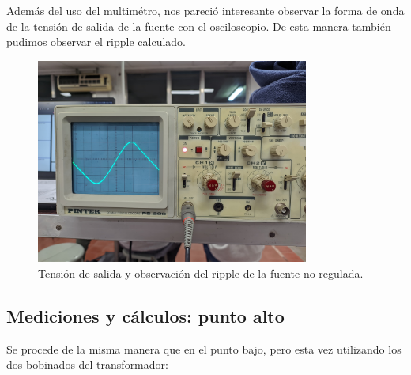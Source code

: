 \documentclass[chaptersright]{informeutn}
\begin{document}
        Además del uso del multimétro, nos pareció interesante observar la forma de onda de la tensión de salida de la
        fuente con el osciloscopio. De esta manera también pudimos observar el ripple calculado.
        \begin{figure}[h!]
          \centering
          \includegraphics[width=0.8\textwidth]{pictures/ripple_fuente-nreg.jpeg}
          \caption{Tensión de salida y observación del ripple de la fuente no regulada.}
        \end{figure}

        \subsection{Mediciones y cálculos: punto alto}
            Se procede de la misma manera que en el punto bajo, pero esta vez utilizando los dos bobinados del
            transformador:
\end{document}
